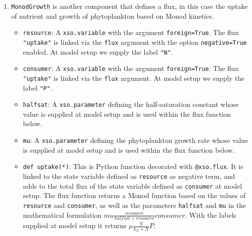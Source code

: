 \documentclass[journal abbreviation, manuscript]{copernicus}
\begin{document}
\begin{enumerate}
    \item \texttt{MonodGrowth} is another component that defines a flux, in this case the uptake of nutrient and growth of phytoplankton based on Monod kinetics.
    \begin{itemize}
        \item \texttt{resource}: A \texttt{xso.variable} with the argument \texttt{foreign=True}. The flux \texttt{"uptake"} is linked via the \texttt{flux} argument with the option \texttt{negative=True} enabled. At model setup we supply the label \texttt{"N"}.
        \item \texttt{consumer}: A \texttt{xso.variable} with the argument \texttt{foreign=True}. The flux \texttt{"uptake"} is linked via the \texttt{flux} argument. At model setup we supply the label \texttt{"P"}.
        \item \texttt{halfsat}: A \texttt{xso.parameter} defining the half-saturation constant whose value is supplied at model setup and is used within the flux function below.
        \item \texttt{mu}: A \texttt{xso.parameter} defining the phytoplankton growth rate whose value is supplied at model setup and is used within the flux function below.
        \item \texttt{def uptake(*)}: This is Python function  decorated with \texttt{@xso.flux}. It is linked to the state variable defined as \texttt{resource} as negative term, and adds to the total flux of the state variable defined as \texttt{consumer} at model setup. The flux function returns a Monod function based on the values of \texttt{resource} and \texttt{consumer}, as well as the parameters \texttt{halfsat} and \texttt{mu} in the mathematical formulation $\mathit{mu} \frac{\mathit{resource}}{\mathit{halfsat}+\mathit{resource}} \mathit{consumer}$. With the labels supplied at model setup it returns $\mu \frac{N}{k_N+N} P$.
    \end{itemize}
    

\end{enumerate}
\end{document}
